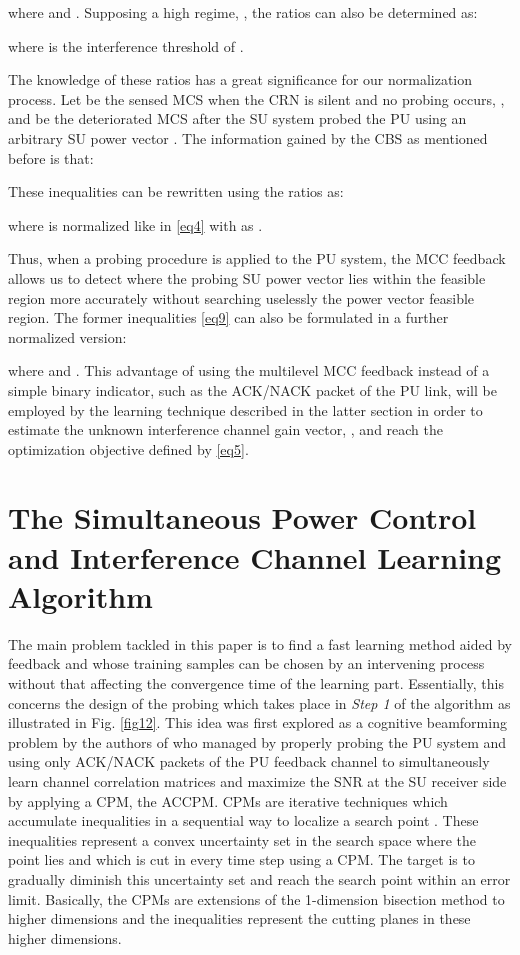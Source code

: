 \documentclass[journal]{IEEEtran}
\begin{document}
where  and . Supposing a high  regime, , the  ratios can also be determined as:


where  is the interference threshold of .

The knowledge of these ratios has a great significance for our normalization process. Let  be the sensed MCS when the CRN is silent and no probing occurs, , and  be the deteriorated MCS after the SU system probed the PU using an arbitrary SU power vector . The information gained by the CBS as mentioned before is that:


These inequalities can be rewritten using the  ratios as:


where  is normalized like in \eqref{eq4} with  as .

Thus, when a probing procedure is applied to the PU system, the MCC feedback allows us to detect where the probing SU power vector lies within the feasible region more accurately without searching uselessly the power vector feasible region. The former inequalities \eqref{eq9} can also be formulated in a further normalized version:


where  and . This advantage of using the multilevel MCC feedback instead of a simple binary indicator, such as the ACK/NACK packet of the PU link, will be employed by the learning technique described in the latter section in order to estimate the unknown interference channel gain vector, , and reach the optimization objective defined by \eqref{eq5}.
  

\section{The Simultaneous Power Control and Interference Channel Learning Algorithm}

The main problem tackled in this paper is to find a fast learning method aided by feedback and whose training samples can be chosen by an intervening process without that affecting the convergence time of the learning part. Essentially, this concerns the design of the probing which takes place in \textit{Step 1} of the algorithm as illustrated in Fig. \ref{fig12}. This idea was first explored as a cognitive beamforming problem by the authors of \cite{biban73} who managed by properly probing the PU system and using only ACK/NACK packets of the PU feedback channel to simultaneously learn channel correlation matrices and maximize the SNR at the SU receiver side by applying a CPM, the ACCPM. CPMs are iterative techniques which accumulate inequalities in a sequential way to localize a search point \cite{biban86}. These inequalities represent a convex uncertainty set in the search space where the point lies and which is cut in every time step using a CPM. The target is to gradually diminish this uncertainty set and reach the search point within an error limit. Basically, the CPMs are extensions of the 1-dimension bisection method to higher dimensions and the inequalities represent the cutting planes in these higher dimensions.
\end{document}
